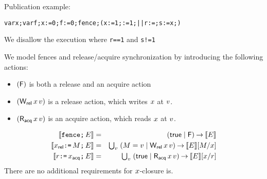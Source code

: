 Publication example:
\begin{alltt}
    var x; var f; x:=0; f:=0; fence; (x:=1; :=1;  ||  r:=; s:=x;)
\end{alltt}
We disallow the execution where \texttt{r==1} and \texttt{s!=1}

We model fences and release/acquire synchronization by introducing the
following actions:
\begin{itemize}
\item $(\mathsf{F})$ is both a release and an acquire action
\item $(\mathsf{W_{rel}}\,x\,v)$ is a release action, which writes $x$ at $v$.
\item $(\mathsf{R_{acq}}\,x\,v)$ is an acquire action, which reads $x$ at $v$.
\end{itemize}
\begin{eqnarray*}
  \llbracket\texttt{fence}\texttt{;}\, E\rrbracket & = & (\mathsf{true} \mid \mathsf{F}) \mathbin\rightarrow \llbracket E\rrbracket \\
  \llbracket x_{\mathsf{rel}}\texttt{:=}\,M\texttt{;}\, E\rrbracket & = & \textstyle\bigcup_v\; (M=v \mid \mathsf{W_{rel}}\,x\,v) \mathbin\rightarrow \llbracket E\rrbracket[M/x] \\
  \llbracket r\texttt{:=}\,x_{\mathsf{acq}}\texttt{;}\, E\rrbracket & = & \textstyle\bigcup_v\; (\mathsf{true} \mid \mathsf{R_{acq}}\,x\,v) \mathbin\rightarrow \llbracket E\rrbracket[x/r] 
\end{eqnarray*}
There are no additional requirements for $x$-closure is.

